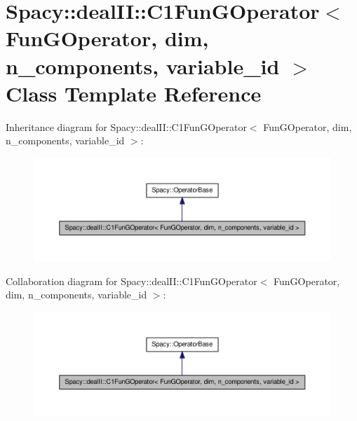 \hypertarget{classSpacy_1_1dealII_1_1C1FunGOperator}{\section{\-Spacy\-:\-:deal\-I\-I\-:\-:\-C1\-Fun\-G\-Operator$<$ \-Fun\-G\-Operator, dim, n\-\_\-components, variable\-\_\-id $>$ \-Class \-Template \-Reference}
\label{classSpacy_1_1dealII_1_1C1FunGOperator}
}


\-Inheritance diagram for \-Spacy\-:\-:deal\-I\-I\-:\-:\-C1\-Fun\-G\-Operator$<$ \-Fun\-G\-Operator, dim, n\-\_\-components, variable\-\_\-id $>$\-:
\nopagebreak
\begin{figure}[H]
\begin{center}
\leavevmode
\includegraphics[width=350pt]{classSpacy_1_1dealII_1_1C1FunGOperator__inherit__graph}
\end{center}
\end{figure}


\-Collaboration diagram for \-Spacy\-:\-:deal\-I\-I\-:\-:\-C1\-Fun\-G\-Operator$<$ \-Fun\-G\-Operator, dim, n\-\_\-components, variable\-\_\-id $>$\-:
\nopagebreak
\begin{figure}[H]
\begin{center}
\leavevmode
\includegraphics[width=350pt]{classSpacy_1_1dealII_1_1C1FunGOperator__coll__graph}
\end{center}
\end{figure}

